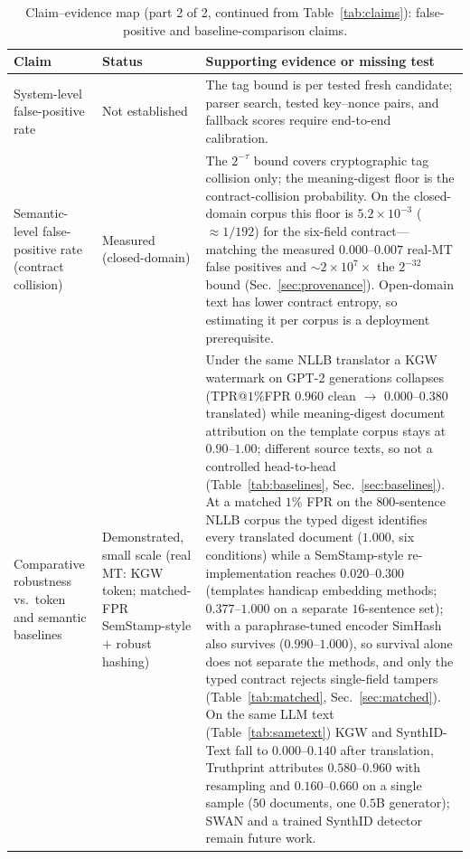 \documentclass[11pt]{article}
\begin{document}
\begin{table}[t]
\centering
\small
\caption{Claim--evidence map (part 2 of 2, continued from Table~\ref{tab:claims}):
false-positive and baseline-comparison claims.}
\label{tab:claims2}
\begin{tabularx}{\textwidth}{@{}>{\raggedright\arraybackslash}p{3.1cm}>{\raggedright\arraybackslash}p{3.0cm}X@{}}
\toprule
Claim & Status & Supporting evidence or missing test \\
\midrule
System-level false-positive rate & Not established & The tag bound is per tested fresh candidate; parser search, tested key--nonce pairs, and fallback scores require end-to-end calibration. \\
Semantic-level false-positive rate (contract collision) & Measured (closed-domain) & The $2^{-\tau}$ bound covers cryptographic tag collision only; the meaning-digest floor is the contract-collision probability. On the closed-domain corpus this floor is $5.2\times10^{-3}$ ($\approx1/192$) for the six-field contract---matching the measured $0.000$--$0.007$ real-MT false positives and $\sim\!2\times10^{7}\times$ the $2^{-32}$ bound (Sec.~\ref{sec:provenance}). Open-domain text has lower contract entropy, so estimating it per corpus is a deployment prerequisite. \\
Comparative robustness vs.\ token and semantic baselines & Demonstrated, small scale (real MT: KGW token; matched-FPR SemStamp-style $+$ robust hashing) & Under the same NLLB translator a KGW watermark on GPT-2 generations collapses (TPR@$1\%$FPR $0.960$ clean $\to$ $0.000$--$0.380$ translated) while meaning-digest document attribution on the template corpus stays at $0.90$--$1.00$; different source texts, so not a controlled head-to-head (Table~\ref{tab:baselines}, Sec.~\ref{sec:baselines}). At a matched $1\%$ FPR on the $800$-sentence NLLB corpus the typed digest identifies every translated document ($1.000$, six conditions) while a SemStamp-style re-implementation reaches $0.020$--$0.300$ (templates handicap embedding methods; $0.377$--$1.000$ on a separate $16$-sentence set); with a paraphrase-tuned encoder SimHash also survives ($0.990$--$1.000$), so survival alone does not separate the methods, and only the typed contract rejects single-field tampers (Table~\ref{tab:matched}, Sec.~\ref{sec:matched}). On the same LLM text (Table~\ref{tab:sametext}) KGW and SynthID-Text fall to $0.000$--$0.140$ after translation, Truthprint attributes $0.580$--$0.960$ with resampling and $0.160$--$0.660$ on a single sample ($50$ documents, one $0.5$B generator); SWAN and a trained SynthID detector remain future work. \\

\end{tabularx}
\end{table}
\end{document}

